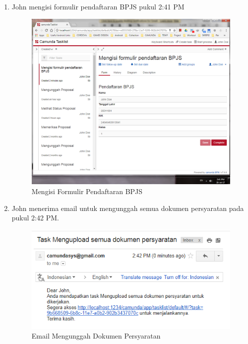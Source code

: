 \begin{enumerate}
	\item John mengisi formulir pendaftaran BPJS pukul 2:41 PM
			\begin{figure}[H]
			\centering
			\includegraphics[scale=0.5]{Gambar/Bab-5/kasus2/3}
			\caption{Mengisi Formulir Pendaftaran BPJS} 
			\label{fig:pengujian_kasus2_3}
	\end{figure}
	

	\item John menerima email untuk mengunggah semua dokumen persyaratan pada pukul 2:42 PM.
			\begin{figure}[H]
			\centering 
			\includegraphics[scale=0.8]{Gambar/Bab-5/kasus2/4}
			\caption{Email Mengunggah Dokumen Persyaratan} 
			\label{fig:pengujian_kasus2_4}
	\end{figure}
	


\end{enumerate}
